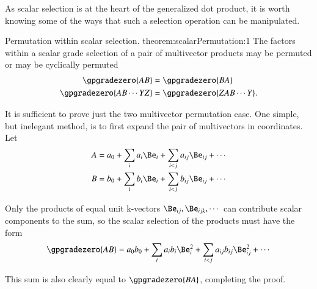 %
%
As scalar selection is at the heart of the
generalized dot product, it is worth knowing
some of the ways that such a selection operation can be manipulated.

\maketheorem
{Permutation within scalar selection.}
{theorem:scalarPermutation:1}{
The factors within a scalar grade selection of a pair of multivector products may be permuted or may be cyclically permuted
\begin{equation*}
\begin{aligned}
\gpgradezero{A B} &= \gpgradezero{B A} \\
\gpgradezero{A B \cdots Y Z} &= \gpgradezero{Z A B \cdots Y}.
\end{aligned}
\end{equation*}
} %

It is sufficient to prove just the two multivector permutation case.
One simple, but inelegant method, is to first expand the pair of multivectors in coordinates.
Let
\begin{equation}\label{eqn:scalarSelectionPermutation:40}
\begin{aligned}
A &= a_0 + \sum_i a_i \Be_i + \sum_{i < j} a_{ij} \Be_{ij} + \cdots \\
B &= b_0 + \sum_i b_i \Be_i + \sum_{i < j} b_{ij} \Be_{ij} + \cdots
\end{aligned}
\end{equation}

Only the products of equal unit k-vectors \( \Be_{ij}, \Be_{ijk}, \cdots \)  can contribute scalar components to the sum, so the scalar selection of the products must have the form
\begin{dmath}\label{eqn:scalarSelectionPermutation:60}
\gpgradezero{ A B }
=
a_0 b_0 + \sum_i a_i b_i \Be_i^2 + \sum_{i < j} a_{ij} b_{ij} \Be_{ij}^2 + \cdots
\end{dmath}

This sum is also clearly equal to \( \gpgradezero{ B A } \), completing the proof.
